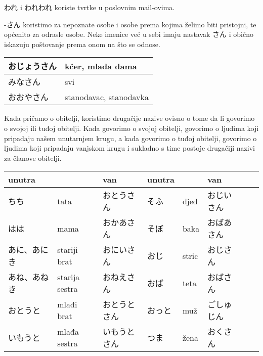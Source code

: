 	\vspace{10pt}	
	
	われ i われわれ koriste tvrtke u poslovnim mail-ovima.
	
	
	\ten {}

	\vspace{10pt}

	-さん	koristimo za nepoznate osobe i osobe prema kojima želimo biti pristojni, te općenito za odrasle osobe. Neke imenice već u sebi imaju nastavak さん i obično iskazuju poštovanje prema onom na što se odnose.
	
	
	\vspace{10pt}	
	
	\begin{tabular}{|l|l|}
		\hline
		おじょうさん&kćer, mlada dama\\\hline
		みなさん&svi\\\hline
		おおやさん&stanodavac, stanodavka\\\hline

	\end{tabular}
	
	\vspace{10pt}
	
	Kada pričamo o obitelji, koristimo drugačije nazive ovisno o tome da li govorimo o svojoj ili tuđoj obitelji. Kada govorimo o svojoj obitelji, govorimo o ljudima koji pripadaju našem unutarnjem krugu, a kada govorimo o tuđoj obitelji, govorimo o ljudima koji pripadaju vanjskom krugu i sukladno s time postoje drugačiji nazivi za članove obitelji.
	
	\vspace{10pt}	
	
	\begin{tabular}{|l|l|l||l|l|l|l|l|}
		\hline
		unutra& &van&unutra& &van\\\hline
		ちち&tata&おとうさん&そふ&djed&おじいさん\\\hline
		はは&mama&おかあさん&そぼ&baka&おばあさん\\\hline
		あに、あにき&stariji brat&おにいさん&おじ&stric&おじさん\\\hline
		あね、あねき&starija sestra&おねえさん&おば&teta&おばさん\\\hline
		おとうと&mlađi brat&おとうとさん&おっと&muž&ごしゅじん\\\hline
		いもうと&mlađa sestra&いもうとさん&つま&žena&おくさん\\\hline
	\end{tabular}
	
